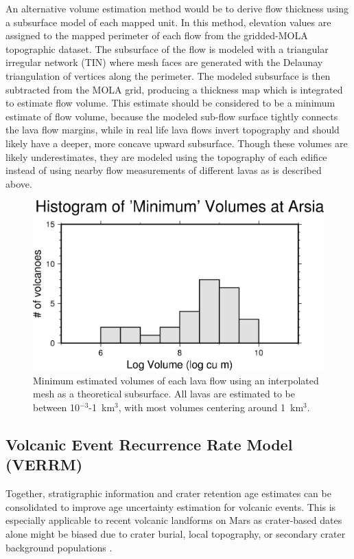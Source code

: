 \documentclass[12pt,letter]{article}
\begin{document}
An alternative volume estimation method would be to derive flow thickness using a subsurface model of each mapped unit. In this method, elevation values are assigned to the mapped perimeter of each flow from the gridded-MOLA topographic dataset. The subsurface of the flow is modeled with a triangular irregular network (TIN) where mesh faces are generated with the Delaunay triangulation of vertices along the perimeter. The modeled subsurface is then subtracted from the MOLA grid, producing a thickness map which is integrated to estimate flow volume. This estimate should be considered to be a minimum estimate of flow volume, because the modeled sub-flow surface tightly connects the lava flow margins, while in real life lava flows invert topography and should likely have a deeper, more concave upward subsurface. Though these volumes are likely underestimates, they are modeled using the topography of each edifice instead of using nearby flow measurements of different lavas as is described above.

\begin{figure}
\centering
\includegraphics[width=0.5\linewidth]{figures/volumehist.png}
\caption{Minimum estimated volumes of each lava flow using an interpolated mesh as a theoretical subsurface. All lavas are estimated to be between 10$^{-3}$-1~km$^3$, with most volumes centering around 1~km$^3$.}
\label{fig_volumehistogram}
\end{figure}

\subsection{Volcanic Event Recurrence Rate Model (VERRM)}

Together, stratigraphic information and crater retention age estimates can be consolidated to improve age uncertainty estimation for volcanic events. This is especially applicable to recent volcanic landforms on Mars as crater-based dates alone might be biased due to crater burial, local topography, or secondary crater background populations \citep{robbins2011volcanic,platz2011eruption}.
\end{document}

